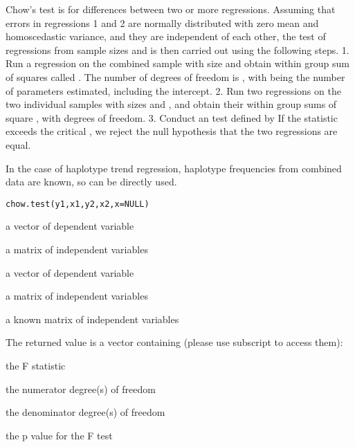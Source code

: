 \documentclass[a4paper]{book}
\begin{document}
\begin{Description}\relax
Chow's test is for differences between two or more regressions.  Assuming that
errors in regressions 1 and 2 are normally distributed with zero mean and
homoscedastic variance, and they are independent of each other, the test of
regressions from sample sizes  and  is then carried out using
the following steps.  1.  Run a regression on the combined sample with size
 and obtain within group sum of squares called .  The
number of degrees of freedom is , with  being the number
of parameters estimated, including the intercept.  2.  Run two regressions on
the two individual samples with sizes  and , and obtain their
within group sums of square , with  degrees of
freedom.  3.  Conduct an  test defined by  If the  statistic
exceeds the critical , we reject the null hypothesis that the two
regressions are equal.

In the case of haplotype trend regression, haplotype frequencies from combined
data are known, so can be directly used.\end{Description}
\begin{Usage}
\begin{verbatim}chow.test(y1,x1,y2,x2,x=NULL)\end{verbatim}
\end{Usage}
\begin{Arguments}
\begin{ldescription}
\item[\code{y1}] a vector of dependent variable
\item[\code{x1}] a matrix of independent variables
\item[\code{y2}] a vector of dependent variable
\item[\code{x2}] a matrix of independent variables
\item[\code{x}] a known matrix of independent variables
\end{ldescription}
\end{Arguments}
\begin{Value}
The returned value is a vector containing (please use subscript to access them):

\begin{ldescription}
\item[\code{F}] the F statistic
\item[\code{df1}] the numerator degree(s) of freedom
\item[\code{df2}] the denominator degree(s) of freedom
\item[\code{p}] the p value for the F test
\end{ldescription}
\end{Value}
\end{document}
